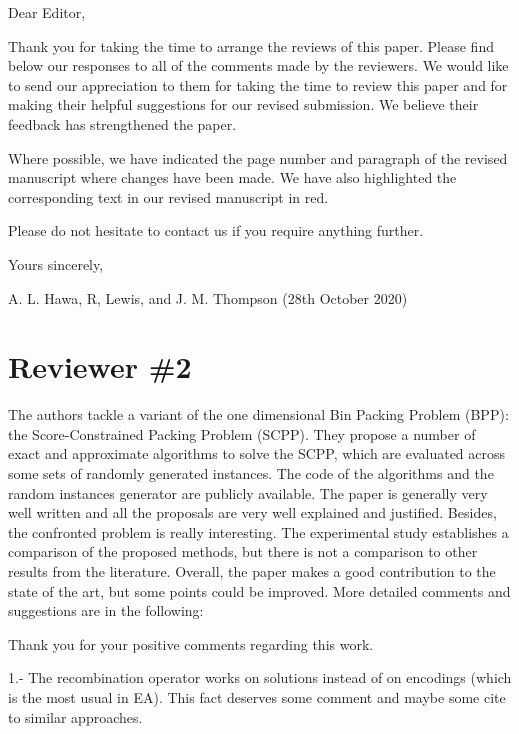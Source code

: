 \documentclass[a4paper,11pt]{article}
\newcommand{\ea}[1]{{\color{myRed}#1}}
\newcommand{\note}[1]{{\color{myDarkBlue2}#1}}
\begin{document}
\note{Dear Editor, 

Thank you for taking the time to arrange the reviews of this paper. Please find below our responses to all of the comments made by the reviewers. We would like to send our appreciation to them for taking the time to review this paper and for making their helpful suggestions for our revised submission. We believe their feedback has strengthened the paper.

Where possible, we have indicated the page number and paragraph of the revised manuscript where changes have been made. We have also highlighted the corresponding text in our revised manuscript in red.

Please do not hesitate to contact us if you require anything further.

Yours sincerely,

A. L. Hawa, R, Lewis, and J. M. Thompson (28th October 2020)}


\section*{Reviewer \#2}
The authors tackle a variant of the one dimensional Bin Packing Problem (BPP): the Score-Constrained Packing Problem (SCPP). They propose a number of exact and approximate algorithms to solve the SCPP, which are evaluated across some sets of randomly generated instances. The code of the algorithms and the random instances generator are publicly available.
The paper is generally very well written and all the proposals are very well explained and justified. Besides, the confronted problem is really interesting. The experimental study establishes a comparison of the proposed methods, but there is not a comparison to other results from the literature. Overall, the paper makes a good contribution to the state of the art, but some points could be improved. More detailed comments and suggestions are in the following:

\note{Thank you for your positive comments regarding this work.}


1.- The recombination operator works on solutions instead of on encodings (which is the most usual in EA). This fact deserves some comment and maybe some cite to similar approaches.

\end{document}
